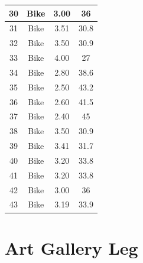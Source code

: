 \begin{table}[h!]
\begin{tabular}{|c|c|c|c|}
        30	&Bike	&3.00	&36 \\ \hline
        31	&Bike	&3.51	&30.8 \\ \hline
        32	&Bike	&3.50	&30.9 \\ \hline
        33	&Bike	&4.00	&27 \\ \hline
        34	&Bike	&2.80	&38.6 \\ \hline
        35	&Bike	&2.50	&43.2 \\ \hline
        36	&Bike	&2.60	&41.5 \\ \hline
        37	&Bike	&2.40	&45 \\ \hline
        38	&Bike	&3.50	&30.9 \\ \hline
        39	&Bike	&3.41	&31.7 \\ \hline
        40	&Bike	&3.20	&33.8 \\ \hline
        41	&Bike	&3.20	&33.8 \\ \hline
        42	&Bike	&3.00	&36 \\ \hline
        43	&Bike	&3.19	&33.9 \\ \hline

    \end{tabular}
\end{table}

\clearpage
\section{Art Gallery Leg}

